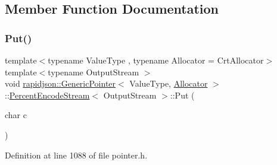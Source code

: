\subsection{Member Function Documentation}
\mbox{\label{classrapidjson_1_1_generic_pointer_1_1_percent_encode_stream_af3a6e9027fa1ce50198aa97e3f102523}} 
\subsubsection{\texorpdfstring{Put()}{Put()}}
{\footnotesize\ttfamily template$<$typename Value\+Type , typename Allocator  = Crt\+Allocator$>$ \\
template$<$typename Output\+Stream $>$ \\
void \mbox{\hyperlink{classrapidjson_1_1_generic_pointer}{rapidjson\+::\+Generic\+Pointer}}$<$ Value\+Type, \mbox{\hyperlink{classrapidjson_1_1_allocator}{Allocator}} $>$\+::\mbox{\hyperlink{classrapidjson_1_1_generic_pointer_1_1_percent_encode_stream}{Percent\+Encode\+Stream}}$<$ Output\+Stream $>$\+::Put (\begin{DoxyParamCaption}\item[{char}]{c }\end{DoxyParamCaption})}



Definition at line 1088 of file pointer.\+h.


